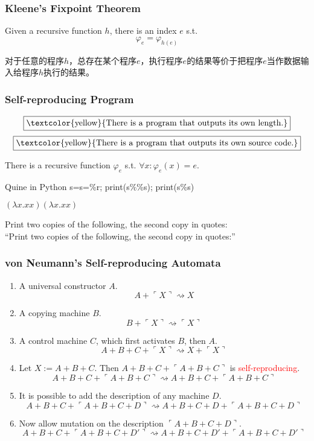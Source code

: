 \documentclass[UTF8,aspectratio=43,11pt,colorlinks,compress,openany]{beamer}%
\begin{document}
\begin{frame}\frametitle{Kleene's Fixpoint Theorem}
\setlength\abovedisplayskip{0pt}
\setlength\belowdisplayskip{0pt}
	\begin{theorem}
		Given a recursive function $h$, there is an index $e$ s.t.
		\[\varphi_e=\varphi_{h(e)}\]
	\end{theorem}
对于任意的程序$h$，总存在某个程序$e$，执行程序$e$的结果等价于把程序$e$当作数据输入给程序$h$执行的结果。
\end{frame}

\begin{frame}\frametitle{Self-reproducing Program}
	\[\fbox{\textcolor{yellow}{There is a program that outputs its own length.}}\]
	\[\fbox{\textcolor{yellow}{There is a program that outputs its own source code.}}\]
	\begin{corollary}
		There is a recursive function $\varphi_e$ s.t. $\forall x: \varphi_e(x)=e$.
	\end{corollary}
\begin{block}{Quine in Python}
s=\textquotesingle s=\%r; print(s\%\%s)\textquotesingle; print(s\%s)
\end{block}
\centerline{$(\lambda x.xx)(\lambda x.xx)$}
\begin{block}{}
	Print two copies of the following, the second copy in quotes:\\
	``Print two copies of the following, the second copy in quotes:''
\end{block}
	\centerline{\fbox{\textcolor{green}{DNA / mutation / evolution}}}
\end{frame}

\begin{frame}\frametitle{von Neumann's Self-reproducing Automata}
	\begin{enumerate}
		\item A universal constructor $A$.
		\[A+\ulcorner X\urcorner\rightsquigarrow X\]
		\item A copying machine $B$.
		\[B+\ulcorner X\urcorner\rightsquigarrow\ulcorner X\urcorner\]
		\item A control machine $C$, which first activates $B$, then $A$.
		\[A+B+C+\ulcorner X\urcorner\rightsquigarrow X+\ulcorner X\urcorner\]
		\item Let $X:=A+B+C$. {Then} $A+B+C+\ulcorner A+B+C\urcorner$ is \textcolor{red}{self-reproducing}.
		\[A+B+C+\ulcorner A+B+C\urcorner\rightsquigarrow A+B+C+\ulcorner A+B+C\urcorner\]
		\item It is possible to add the description of any machine $D$.
		\[A+B+C+\ulcorner A+B+C+D\urcorner\rightsquigarrow A+B+C+D+\ulcorner A+B+C+D\urcorner\]
		\item Now allow mutation on the description $\ulcorner A+B+C+D\urcorner$.
		\[A+B+C+\ulcorner A+B+C+D'\urcorner\rightsquigarrow A+B+C+D'+\ulcorner A+B+C+D'\urcorner\]
	\end{enumerate}
\end{frame}
\end{document}

